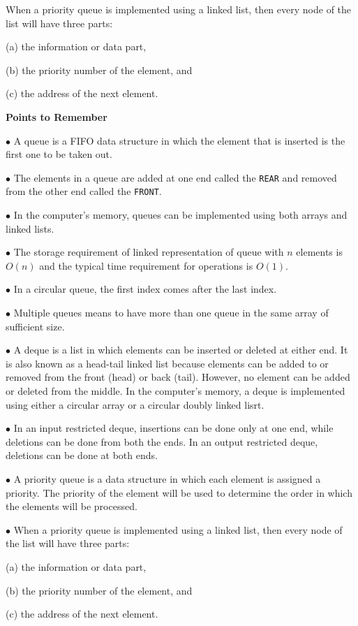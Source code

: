 \vskip 1mm
When a priority queue is implemented using a linked list, then every node of the list will have three parts:

\vskip 3mm
(a) the information or data part,

\vskip 1mm
(b) the priority number of the element, and

\vskip 1mm
(c) the address of the next element.

\filbreak
\vskip 1cm
{\bf Points to Remember}

\vskip 1mm
$\bullet$ A queue is a FIFO data structure in which the element that is inserted is the first one to be taken out.

\vskip 3mm
$\bullet$ The elements in a queue are added at one end called the {\tt REAR} and removed from the other end called the {\tt FRONT}.

\vskip 3mm
$\bullet$ In the computer's memory, queues can be implemented using both arrays and linked lists.

\vskip 3mm
$\bullet$ The storage requirement of linked representation of queue with $n$ elements is $O(n)$ and the typical time requirement for operations is $O(1)$.

\vskip 3mm
$\bullet$ In a circular queue, the first index comes after the last index.

\vskip 3mm
$\bullet$ Multiple queues means to have more than one queue in the same array of sufficient size.

\vskip 3mm
$\bullet$ A deque is a list in which elements can be inserted or deleted at either end. It is also known as a head-tail linked list because elements can be added to or removed from the front (head) or back (tail). However, no element can be added or deleted from the middle. In the computer's memory, a deque is implemented using either a circular array or a circular doubly linked lisrt.

\vskip 3mm
$\bullet$ In an input restricted deque, insertions can be done only at one end, while deletions can be done from both the ends. In an output restricted deque, deletions can be done at both ends.

\vskip 3mm
$\bullet$ A priority queue is a data structure in which each element is assigned a priority. The priority of the element will be used to determine the order in which the elements will be processed.

\vskip 3mm
$\bullet$ When a priority queue is implemented using a linked list, then every node of the list will have three parts:

\vskip 3mm
(a) the information or data part,

\vskip 1mm
(b) the priority number of the element, and

\vskip 1mm
(c) the address of the next element.


\vfill\eject
\bye
